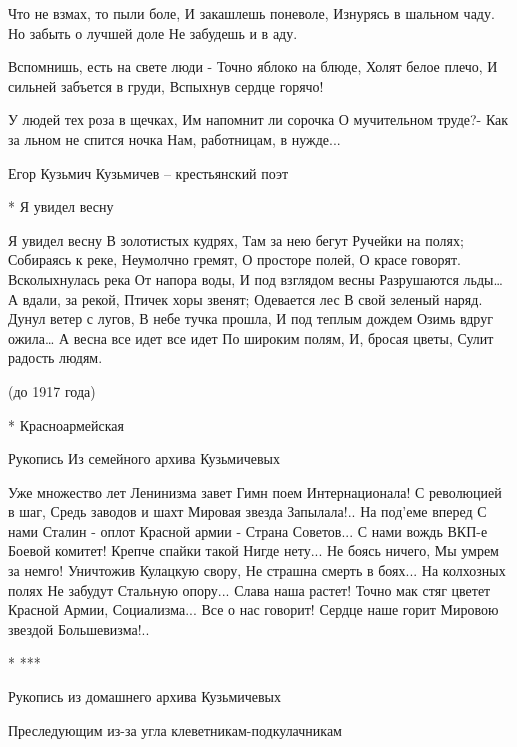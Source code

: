 Что не взмах, то пыли боле,
И закашлешь поневоле,
          Изнурясь в шальном чаду.
Но забыть о лучшей доле
          Не забудешь и в аду.

Вспомнишь, есть на свете люди -
Точно яблоко на блюде,
          Холят белое плечо,
И сильней забъется в груди,
          Вспыхнув сердце горячо!

У людей тех роза в щечках,
Им напомнит ли сорочка
          О мучительном труде?-
Как за льном не спится ночка
          Нам, работницам, в нужде...

Егор Кузьмич Кузьмичев – крестьянский поэт


* Я увидел весну

Я увидел весну
     В золотистых кудрях,
Там за нею бегут
     Ручейки на полях;
Собираясь к реке,
     Неумолчно гремят,
О просторе полей,
     О красе говорят.
Всколыхнулась река
     От напора воды,
И под взглядом весны
     Разрушаются льды…
А вдали, за рекой,
     Птичек хоры звенят;
Одевается лес
     В свой зеленый наряд.
Дунул ветер с лугов,
     В небе тучка прошла,
И под теплым дождем
     Озимь вдруг ожила…
А весна все идет все идет
     По широким полям,
И, бросая цветы,
     Сулит радость людям.

(до 1917 года)


* Красноармейская

Рукопись
Из семейного архива Кузьмичевых

Уже множество лет
Ленинизма завет
    Гимн поем
    Интернационала!
С революцией в шаг,
Средь заводов и шахт
    Мировая звезда
    Запылала!..
На под'еме вперед
С нами Сталин - оплот
    Красной армии -
    Страна Советов...
С нами вождь ВКП-е
Боевой комитет!
    Крепче спайки такой
    Нигде нету...
Не боясь ничего,
Мы умрем за немго!
    Уничтожив
    Кулацкую свору,
Не страшна смерть в боях...
На колхозных полях
    Не забудут
    Стальную опору...
Слава наша растет!
Точно мак стяг цветет
    Красной Армии,
    Социализма...
Все о нас говорит!
Сердце наше горит
    Мировою звездой
    Большевизма!..


* ***

Рукопись из домашнего архива Кузьмичевых

    Преследующим из-за угла
    клеветникам-подкулачникам

